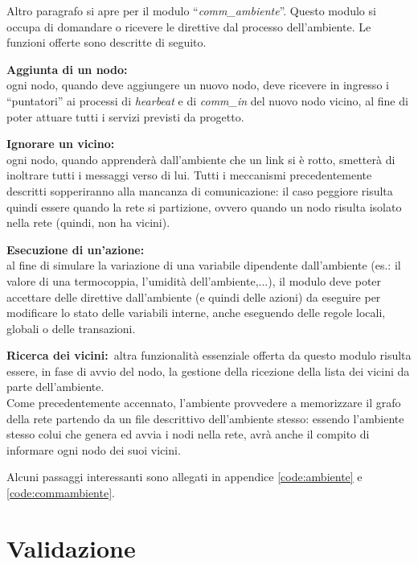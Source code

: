 \documentclass[italian]{memoir}
\begin{document}
Altro paragrafo si apre per il modulo ``\textit{comm\_ambiente}''. Questo modulo si occupa di domandare o ricevere le direttive dal processo dell'ambiente. Le funzioni offerte sono descritte di seguito.
\begin{description}
    \item \textbf{Aggiunta di un nodo:}\\
        ogni nodo, quando deve aggiungere un nuovo nodo, deve ricevere in ingresso i ``puntatori'' ai processi di \textit{hearbeat} e di \textit{comm\_in} del nuovo nodo vicino, al fine di poter attuare tutti i servizi previsti da progetto.
    \item \textbf{Ignorare un vicino:}\\
        ogni nodo, quando apprenderà dall'ambiente che un link si è rotto, smetterà di inoltrare tutti i messaggi verso di lui. Tutti i meccanismi precedentemente descritti sopperiranno alla mancanza di comunicazione: il caso peggiore risulta quindi essere quando la rete si partizione, ovvero quando un nodo risulta isolato nella rete (quindi, non ha vicini).
    \item \textbf{Esecuzione di un'azione:}\\
        al fine di simulare la variazione di una variabile dipendente dall'ambiente (es.: il valore di una termocoppia, l'umidità dell'ambiente,...), il modulo deve poter accettare delle direttive dall'ambiente (e quindi delle azioni) da eseguire per modificare lo stato delle variabili interne, anche eseguendo delle regole locali, globali o delle transazioni.
    \item \textbf{Ricerca dei vicini:}\
            altra funzionalità essenziale offerta da questo modulo risulta essere, in fase di avvio del nodo, la gestione della ricezione della lista dei vicini da parte dell'ambiente.\\
            Come precedentemente accennato, l'ambiente provvedere a memorizzare il grafo della rete partendo da un file descrittivo dell'ambiente stesso: essendo l'ambiente stesso colui che genera ed avvia i nodi nella rete, avrà anche il compito di informare ogni nodo dei suoi vicini.  
        
\end{description}

Alcuni passaggi interessanti sono allegati in appendice \ref{code:ambiente} e \ref{code:commambiente}.


\chapter{Validazione}
\end{document}
